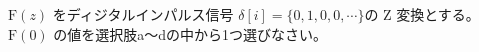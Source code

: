 $\textrm{F}(z)$ をディジタルインパルス信号 $\delta[i] = \{0,1,0,0,\cdots \}$の Z 変換とする。$\textrm{F}(0)$ の値を選択肢a〜dの中から1つ選びなさい。
